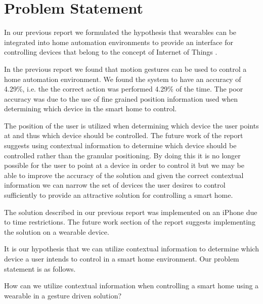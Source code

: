 \section{Problem Statement}
\label{sec:problem-statement}

In our previous report we formulated the hypothesis that wearables can be integrated into home automation environments to provide an interface for controlling devices that belong to the concept of Internet of Things \cite[pp. 14]{prespecialisation}.

In the previous report \cite[pp. 69-73]{prespecialisation} we found that motion gestures can be used to control a home automation environment. We found the system to have an accuracy of 4.29\%, i.e. the the correct action was performed 4.29\% of the time. The poor accuracy was due to the use of fine grained position information used when determining which device in the smart home to control.

The position of the user is utilized when determining which device the user points at and thus which device should be controlled. The future work of the report \cite[pp. 71-73]{prespecialisation} suggests using contextual information to determine which device should be controlled rather than the granular positioning. By doing this it is no longer possible for the user to point at a device in order to control it but we may be able to improve the accuracy of the solution and given the correct contextual information we can narrow the set of devices the user desires to control sufficiently to provide an attractive solution for controlling a smart home.

The solution described in our previous report was implemented on an iPhone due to time restrictions. The future work section of the report suggests implementing the solution on a wearable device.

It is our hypothesis that we can utilize contextual information to determine which device a user intends to control in a smart home environment. Our problem statement is as follows.

\begin{framed}
  How can we utilize contextual information when controlling a smart home using a wearable in a gesture driven solution?
\end{framed}

